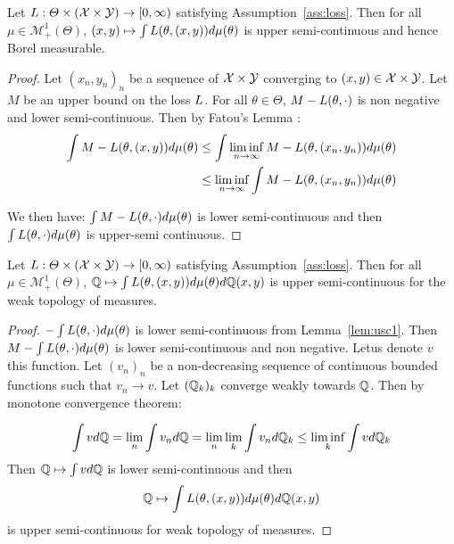 \begin{lemma}
\label{lem:usc1}
Let $L:\Theta\times(\mathcal{X}\times\mathcal{Y})\rightarrow [0,\infty)$ satisfying Assumption~\ref{ass:loss}.
Then for all $\mu\in\mathcal{M}^1_+(\Theta)$, $(x,y)\mapsto\int L(\theta,(x,y))d\mu(\theta)$ is upper semi-continuous and hence Borel measurable.  
\end{lemma}
\begin{proof}
Let $(x_n,y_n)_n$ be a sequence of $\mathcal{X}\times\mathcal{Y}$ converging to $(x,y)\in\mathcal{X}\times\mathcal{Y}$.  Let $M$ be an upper bound on the loss $L$. For all $\theta\in\Theta$, $M-L(\theta,\cdot)$ is non negative and lower semi-continuous. Then by Fatou's Lemma :
\begin{align*}
   \int M-L(\theta,(x,y))d\mu(\theta)&\leq\int \liminf_{n\to\infty}  M-L(\theta,(x_n,y_n))d\mu(\theta)\\
   &\leq  \liminf_{n\to\infty}  \int M-L(\theta,(x_n,y_n))d\mu(\theta) 
\end{align*}

We then have: $\int M- L(\theta,\cdot)d\mu(\theta)$ is lower semi-continuous and then $\int L(\theta,\cdot)d\mu(\theta)$ is upper-semi continuous.
\end{proof}


\begin{lemma}
\label{lem:usc2}

Let $L:\Theta\times(\mathcal{X}\times\mathcal{Y})\rightarrow [0,\infty)$ satisfying Assumption~\ref{ass:loss}.
Then for all $\mu\in\mathcal{M}^1_+(\Theta)$, $\mathbb{Q}\mapsto\int L(\theta,(x,y))d\mu(\theta)d\mathbb{Q}(x,y)$ is upper semi-continuous for the weak topology of measures. 
\end{lemma}
\begin{proof}
 $-\int L(\theta,\cdot)d\mu(\theta) $ is lower semi-continuous from Lemma~\ref{lem:usc1}. Then $M-\int L(\theta,\cdot)d\mu(\theta) $ is lower semi-continuous and non negative. Letus  denote $v$ this function. Let $(v_n)_n$ be a non-decreasing sequence of continuous bounded functions such that $v_n\to v$. Let $(\mathbb{Q}_k)_k$ converge weakly towards $\mathbb{Q}$. Then by monotone convergence theorem:
 
 \begin{align*}
     \int vd\mathbb{Q} = \lim_n \int v_nd\mathbb{Q} =\lim_n \lim_k\int v_nd\mathbb{Q}_k\leq \liminf_k \int vd\mathbb{Q}_k
 \end{align*}
 Then $\mathbb{Q}\mapsto\int vd\mathbb{Q}$ is lower semi-continuous and then 
 \begin{align*}
    \mathbb{Q}\mapsto\int L(\theta,(x,y))d\mu(\theta)d\mathbb{Q}(x,y)
 \end{align*}
  is upper semi-continuous for weak topology of measures. 
 \end{proof}



